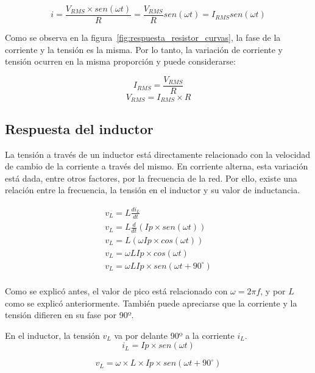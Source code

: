 $$ i = \frac{V_{RMS} \times sen(\omega t)}{R} = \frac{V_{RMS}}{R} sen(\omega t) = I_{RMS} sen(\omega t) $$

Como se observa en la figura~\ref{fig:respuesta_resistor_curvas}, la fase de la corriente y la tensión es la misma. Por lo tanto, la variación de corriente y tensión ocurren en la misma proporción y puede considerarse:

\begin{equation}
	\label{eq:i_resistor_alterna}
	I_{RMS} = \frac{V_{RMS}}{R}
\end{equation}
\begin{equation}
	\label{eq:i_resistor_alterna}
	V_{RMS} = I_{RMS}\times R
\end{equation}

\subsection{Respuesta del inductor}

La tensión a través de un inductor está directamente relacionado con la velocidad de cambio de la corriente a través del mismo. En corriente alterna, esta variación está dada, entre otros factores, por la frecuencia de la red. Por ello, existe una relación entre la frecuencia, la tensión en el inductor y su valor de inductancia.

\begin{eqnarray*}
	v_L = L \frac{di_L}{dt} \\
	v_L = L \frac{d}{dt}(Ip\times sen(\omega t)) \\
	v_L = L( \omega Ip\times cos (\omega t)) \\
	v_L = \omega L Ip\times cos(\omega t) \\
	v_L = \omega L Ip\times sen(\omega t +90^{\circ}) \\
\end{eqnarray*}

Como se explicó antes, el valor de pico está relacionado con $\omega=2\pi f$, y por $L$ como se explicó anteriormente. También puede apreciarse que la corriente y la tensión difieren en su fase por 90º.

\begin{conclusiones}
	En el inductor, la tensión $v_L$ va por delante 90º a la corriente $i_L$. 
	\begin{equation}
		\label{eq:i_inductor}
		i_L = Ip\times sen(\omega t)
	\end{equation}
	
	\begin{equation}
		\label{eq:v_inductor}
		v_L = \omega \times L \times Ip \times sen(\omega t + 90^{\circ})
	\end{equation}
	
\end{conclusiones}

